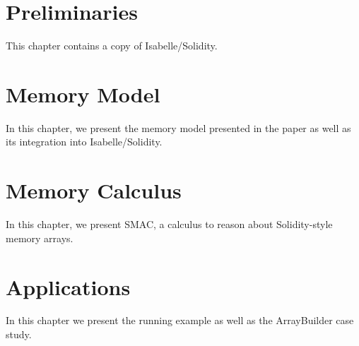 \documentclass[10pt,DIV17,a4paper,abstract=true,twoside=semi,openright]
{scrreprt}
\begin{document}
\clearpage

\chapter{Preliminaries}
This chapter contains a copy of Isabelle/Solidity.








\chapter{Memory Model}

In this chapter, we present the memory model presented in the paper as well as its integration into Isabelle/Solidity.




\chapter{Memory Calculus}

In this chapter, we present SMAC, a calculus to reason about Solidity-style memory arrays.



\chapter{Applications}

In this chapter we present the running example as well as the ArrayBuilder case study.




%    
\end{document}

